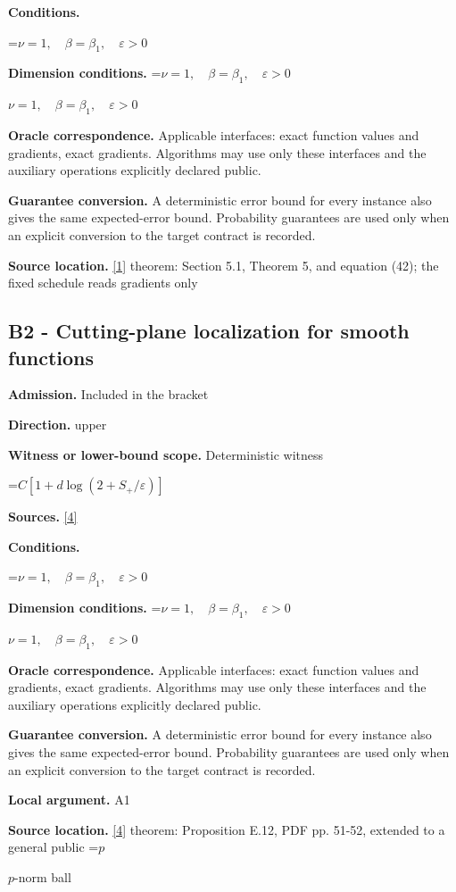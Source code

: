 \documentclass[10pt,a4paper]{article}
\newcommand{\AtlasMath}[1]{\par\begingroup\centering\setbox0=\hbox{$\displaystyle #1$}\ifdim\wd0>1.4\linewidth\typeout{ATLAS WIDE FORMULA: \the\wd0}\fi\ifdim\wd0>\linewidth\resizebox{\linewidth}{!}{\box0}\else\box0\fi\par\endgroup}
\newcommand{\AtlasInlineMath}[1]{\begingroup\setbox0=\hbox{$#1$}\ifdim\wd0>.4\linewidth\endgroup\AtlasMath{#1}\else\endgroup$#1$\fi}
\begin{document}
\textbf{Conditions.} 
\AtlasMath{\nu=1,\quad\beta=\beta_1,\quad\varepsilon>0}


\textbf{Dimension conditions.} \AtlasInlineMath{\nu=1,\quad\beta=\beta_1,\quad\varepsilon>0}

\textbf{Oracle correspondence.} Applicable interfaces: exact function values and gradients, exact gradients. Algorithms may use only these interfaces and the auxiliary operations explicitly declared public.

\textbf{Guarantee conversion.} A deterministic error bound for every instance also gives the same expected-error bound. Probability guarantees are used only when an explicit conversion to the target contract is recorded.

\textbf{Source location.} \href{https://optimization-online.org/wp-content/uploads/2010/12/2865.pdf}{[1]} theorem: Section 5.1, Theorem 5, and equation (42); the fixed schedule reads gradients only

\subsection{B2 - Cutting-plane localization for smooth functions}
\textbf{Admission.} Included in the bracket

\textbf{Direction.} upper

\textbf{Witness or lower-bound scope.} Deterministic witness

\AtlasMath{C[1+d\log(2+S_+/\varepsilon)]}
\textbf{Sources.} \href{https://arxiv.org/pdf/2609.32910}{[4]}

\textbf{Conditions.} 
\AtlasMath{\nu=1,\quad\beta=\beta_1,\quad\varepsilon>0}


\textbf{Dimension conditions.} \AtlasInlineMath{\nu=1,\quad\beta=\beta_1,\quad\varepsilon>0}

\textbf{Oracle correspondence.} Applicable interfaces: exact function values and gradients, exact gradients. Algorithms may use only these interfaces and the auxiliary operations explicitly declared public.

\textbf{Guarantee conversion.} A deterministic error bound for every instance also gives the same expected-error bound. Probability guarantees are used only when an explicit conversion to the target contract is recorded.

\textbf{Local argument.} A1

\textbf{Source location.} \href{https://arxiv.org/pdf/2609.32910}{[4]} theorem: Proposition E.12, PDF pp. 51-52, extended to a general public \AtlasInlineMath{p}-norm ball
\end{document}
